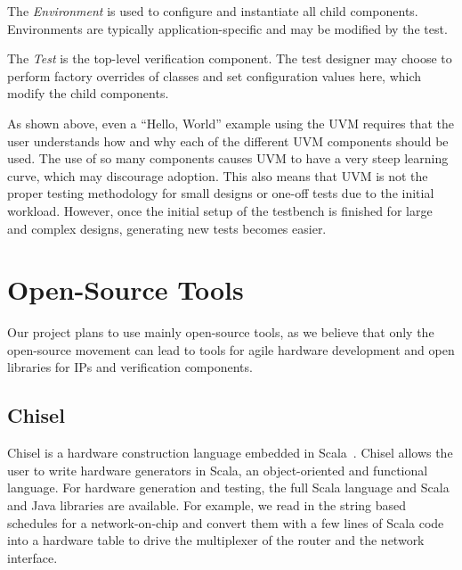 \documentclass[conference]{IEEEtran}
\newcommand{\martin}[1]{{\color{blue} Martin: #1}}
\newcommand{\ducky}[1]{{\color{orange} Richard: #1}}
\renewcommand{\martin}[1]{}
\renewcommand{\ducky}[1]{}
\begin{document}
    The \textit{Environment} is used to configure and instantiate all child components. Environments are typically application-specific and may be modified by the test.
    
    The \textit{Test} is the top-level verification component. The test designer may choose to perform factory overrides of classes and set configuration values here, which modify the child components.

As shown above, even a ``Hello, World'' example using the UVM requires that the user understands how and why each of the different UVM components should be used. The use of so many components causes UVM to have a very steep learning curve, which may discourage adoption. This also means that UVM is not the proper testing methodology for small designs or one-off tests due to the initial workload.
However, once the initial setup of the testbench is finished for large and complex designs, generating new tests becomes easier.


\section{Open-Source Tools}
\label{sec:tools}

Our project plans to use mainly open-source tools, as we believe that only the open-source
movement can lead to tools for agile hardware development and open libraries for IPs
and verification components.

\subsection{Chisel}

Chisel is a hardware construction language embedded in Scala~\cite{chisel:dac2012}.
Chisel allows the user to write hardware generators in Scala, an object-oriented and functional language. For hardware generation and testing, the full Scala language and Scala and Java
libraries are available.
For example, we read in the string based schedules for a network-on-chip
and convert them with a few lines of Scala code into a hardware table to
drive the multiplexer of the router and the network interface.
\end{document}
